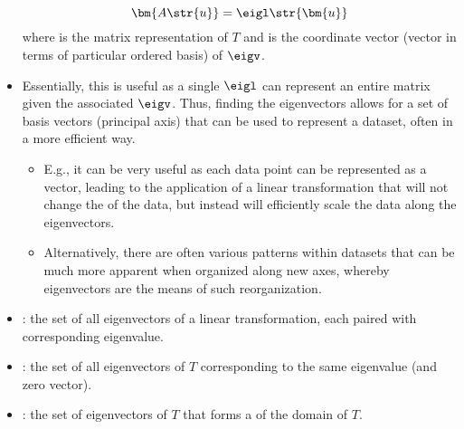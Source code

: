 \begin{itemize}
  \[%
  \bm{A\str{u}} = \eigl \str{\bm{u}}
  \]%
  where  is the matrix representation of \(T\) and  is the coordinate vector (vector in terms of particular ordered basis) of \(\eigv \).
  \item Essentially, this is useful as a single  \(\eigl \) can represent an entire matrix  given the associated  \(\eigv \). Thus, finding the eigenvectors allows for a set of basis vectors (principal axis) that can be used to represent a dataset, often in a more efficient way.
    \begin{itemize}
      \item E.g., it can be very useful as each data point can be represented as a vector, leading to the application of a linear transformation that will not change the \hyperref[Span]{} of the data, but instead will efficiently scale the data along the eigenvectors.
      \item Alternatively, there are often various patterns within datasets that can be much more apparent when organized along new axes, whereby eigenvectors are the means of such reorganization.
    \end{itemize}
  \item {}: the set of all eigenvectors of a linear transformation, each paired with corresponding eigenvalue.
  \item {}: the set of all eigenvectors of \(T\) corresponding to the same eigenvalue (and zero vector). 
  \item {}: the set of eigenvectors of \(T\) that forms a \hyperref[Basis]{} of the domain of \(T\).
  


\end{itemize}
